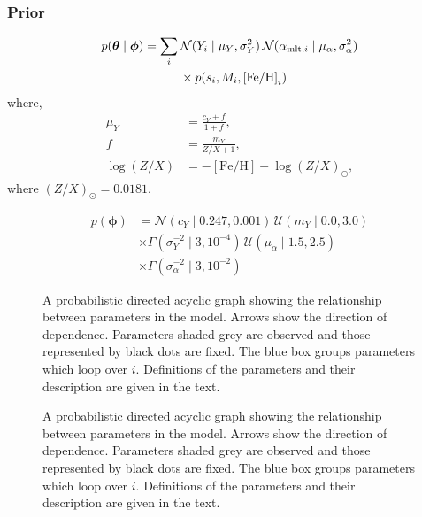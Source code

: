 \documentclass[fleqn,usenatbib]{mnras}
\newcommand{\normaldist}{\mathcal{N}}
\newcommand{\uniformdist}{\mathcal{U}}
\newcommand{\gammadist}{\Gamma}
\renewcommand*{\vec}[1]{\boldsymbol{#1}}
\newcommand{\dydz}{\ensuremath{m_Y}}
\newcommand{\yp}{\ensuremath{c_Y}}
\newcommand{\eep}{\ensuremath{s}}
\newcommand{\feh}{\ensuremath{\mathrm{[Fe/H]}}}
\newcommand{\mlt}[1][]{{\ensuremath{\alpha_{\mathrm{mlt} \ifx#1\empty \else , #1 \fi}}}}
\begin{document}
\subsubsection{Prior}

\begin{equation}
    \begin{split}
        p(\vec{\theta} \mid \vec\phi) = \sum_i \, &\normaldist(Y_i \mid \mu_Y, \sigma_Y^2) \, \normaldist(\mlt[i] \mid \mu_\alpha, \sigma_\alpha^2) \\
        &\times p(\eep_i, M_i, \feh_i)
    \end{split}
\end{equation}
%
where,
%
\begin{align}
    \mu_Y &= \frac{\yp + f}{1 + f}, \\
    f &= \frac{\dydz}{Z / X + 1}, \\
    \log({Z}/{X}) &= - \feh - \log({Z}/{X})_\odot,
\end{align}
%
where \((Z/X)_\odot = 0.0181\).

%
\begin{equation}
    \begin{split}
        p(\vec\phi) &= \normaldist(\yp \mid 0.247, 0.001) \, \uniformdist(\dydz \mid 0.0, 3.0) \\
        &\times \gammadist(\sigma_Y^{-2} \mid 3, 10^{-4}) \, \uniformdist(\mu_\alpha \mid 1.5, 2.5) \\
        &\times \gammadist(\sigma_\alpha^{-2} \mid 3, 10^{-2})
    \end{split}
\end{equation}

\begin{figure}
    \centering
    
    \caption{A probabilistic directed acyclic graph showing the relationship between parameters in the model. Arrows show the direction of dependence.
    Parameters shaded grey are observed and those represented by black dots are fixed. 
    The blue box groups parameters which loop over \(i\). Definitions of the parameters and their description are given in the text.
    }
\end{figure}

\begin{figure}
    \centering
    
    \caption{A probabilistic directed acyclic graph showing the relationship between parameters in the model. Arrows show the direction of dependence.
    Parameters shaded grey are observed and those represented by black dots are fixed. 
    The blue box groups parameters which loop over \(i\). Definitions of the parameters and their description are given in the text.
    }
\end{figure}
\end{document}
